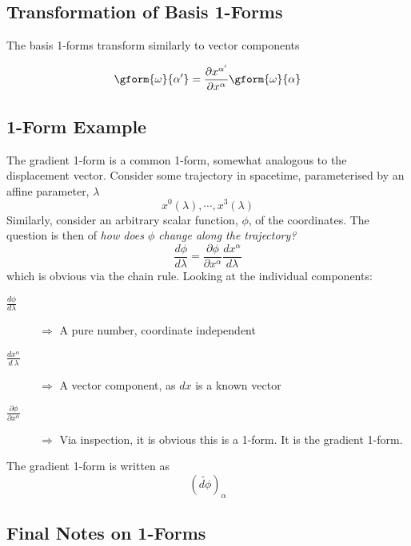 \subsection{Transformation of Basis 1-Forms}
The basis 1-forms transform similarly to vector components
\begin{definition}
    $$ \gform{\omega}{\alpha'} = \frac{\partial x^{\alpha'}}{\partial x^\alpha} \gform{\omega}{\alpha} $$
\end{definition}

\subsection{1-Form Example}
The gradient 1-form is a common 1-form, somewhat analogous to the displacement vector. Consider some trajectory in spacetime, parameterised by an affine parameter, $\lambda$
$$ x^0(\lambda), \cdots, x^3(\lambda) $$
Similarly, consider an arbitrary scalar function, $\phi$, of the coordinates. The question is then of \textit{how does $\phi$ change along the trajectory?}
$$ \frac{d\phi}{d\lambda} = \frac{\partial \phi}{\partial x^\alpha} \frac{d x^\alpha}{d\lambda} $$
which is obvious via the chain rule. Looking at the individual components:
\begin{description}
    \item[$\frac{d\phi}{d\lambda}$] $\Rightarrow$ A pure number, coordinate independent
    \item[$\frac{d x^\alpha}{d\ \lambda}$] $\Rightarrow$ A vector component, as $dx$ is a known vector
    \item[$\frac{\partial \phi}{\partial x^\alpha}$] $\Rightarrow$ Via inspection, it is obvious this is a 1-form. It is the gradient 1-form.
\end{description}
\begin{corollary}
    The gradient 1-form is written as
$$ \left(\widetilde{d\phi}\right)_\alpha $$
\end{corollary}

\subsection{Final Notes on 1-Forms}
